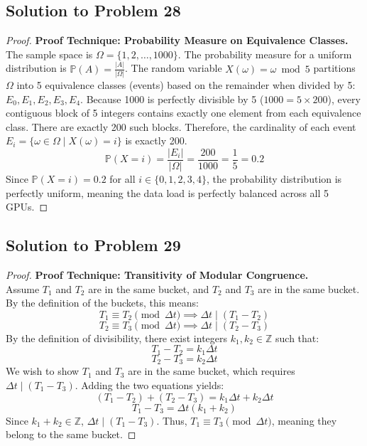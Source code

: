 \documentclass[12pt]{article}
\begin{document}
\subsection{Solution to Problem 28}
\begin{proof}
\textbf{Proof Technique: Probability Measure on Equivalence Classes.} \\
The sample space is $\Omega = \{1, 2, \dots, 1000\}$. The probability measure for a uniform distribution is $\mathbb{P}(A) = \frac{|A|}{|\Omega|}$.
The random variable $X(\omega) = \omega \bmod 5$ partitions $\Omega$ into 5 equivalence classes (events) based on the remainder when divided by 5: $E_0, E_1, E_2, E_3, E_4$.
Because 1000 is perfectly divisible by 5 ($1000 = 5 \times 200$), every contiguous block of 5 integers contains exactly one element from each equivalence class. There are exactly 200 such blocks.
Therefore, the cardinality of each event $E_i = \{\omega \in \Omega \mid X(\omega) = i\}$ is exactly 200.
\[ \mathbb{P}(X = i) = \frac{|E_i|}{|\Omega|} = \frac{200}{1000} = \frac{1}{5} = 0.2 \]
Since $\mathbb{P}(X = i) = 0.2$ for all $i \in \{0, 1, 2, 3, 4\}$, the probability distribution is perfectly uniform, meaning the data load is perfectly balanced across all 5 GPUs.
\end{proof}

\subsection{Solution to Problem 29}
\begin{proof}
\textbf{Proof Technique: Transitivity of Modular Congruence.} \\
Assume $T_1$ and $T_2$ are in the same bucket, and $T_2$ and $T_3$ are in the same bucket. By the definition of the buckets, this means:
\[ T_1 \equiv T_2 \pmod{\Delta t} \implies \Delta t \mid (T_1 - T_2) \]
\[ T_2 \equiv T_3 \pmod{\Delta t} \implies \Delta t \mid (T_2 - T_3) \]
By the definition of divisibility, there exist integers $k_1, k_2 \in \mathbb{Z}$ such that:
\[ T_1 - T_2 = k_1 \Delta t \]
\[ T_2 - T_3 = k_2 \Delta t \]
We wish to show $T_1$ and $T_3$ are in the same bucket, which requires $\Delta t \mid (T_1 - T_3)$. Adding the two equations yields:
\[ (T_1 - T_2) + (T_2 - T_3) = k_1 \Delta t + k_2 \Delta t \]
\[ T_1 - T_3 = \Delta t (k_1 + k_2) \]
Since $k_1 + k_2 \in \mathbb{Z}$, $\Delta t \mid (T_1 - T_3)$. Thus, $T_1 \equiv T_3 \pmod{\Delta t}$, meaning they belong to the same bucket.
\end{proof}
\end{document}
